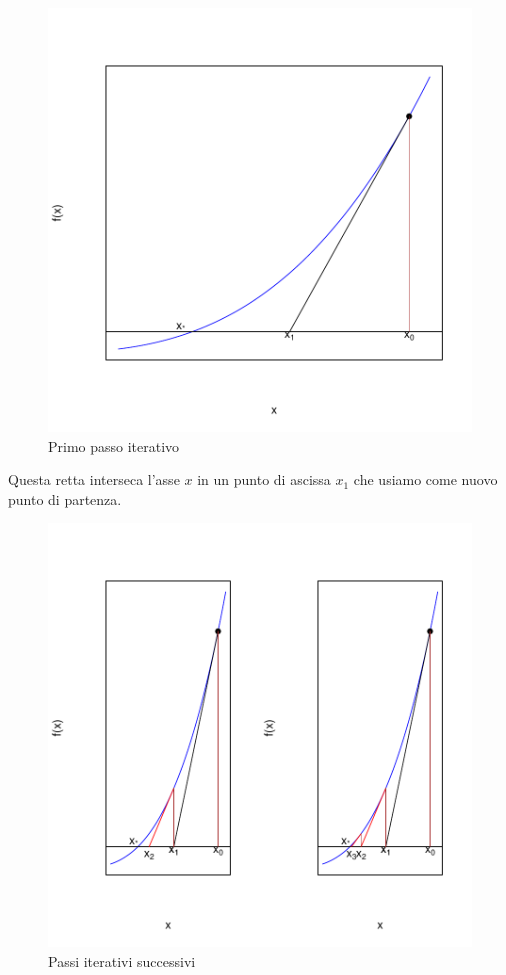 \documentclass[onecolumn,11pt]{book}
\begin{document}
\begin{figure}
\begin{center}
\includegraphics{RbookParte1-step0}
\end{center}
\caption{Primo passo iterativo}
\label{fig:newton1}
\end{figure}
Questa retta interseca l'asse $x$ in un punto di ascissa $x_1$ che usiamo come nuovo punto di partenza.
\begin{figure}\begin{center}
\includegraphics{RbookParte1-step1}
\caption{Passi iterativi successivi}
\label{fig:newton2}
\end{center}
\end{figure}
\end{document}
